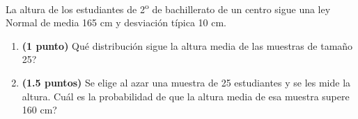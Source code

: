 
La altura de los estudiantes de 2\textsuperscript{o} de bachillerato de un centro sigue una ley Normal de media 165 cm y desviación típica 10 cm.
\begin{enumerate}[label=\alph*)]
\item \textbf{(1 punto)} \textquestiondown{}Qué distribución sigue la altura media de las muestras de tamaño 25?
\item \textbf{(1.5 puntos)} Se elige al azar una muestra de 25 estudiantes y se les mide la altura. \textquestiondown{}Cuál es la probabilidad de que la altura media de esa muestra supere 160 cm?
\end{enumerate}

